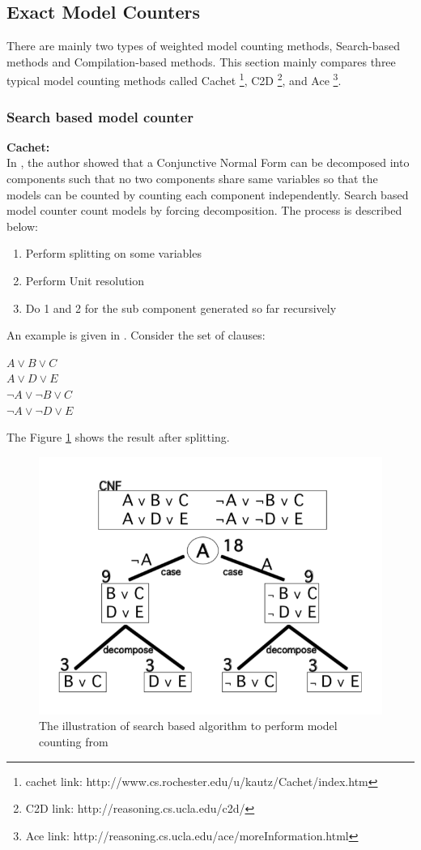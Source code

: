     \subsection{Exact Model Counters}
    There are mainly two types of weighted model counting methods, Search-based methods and Compilation-based methods. This section mainly compares three typical model counting methods called Cachet \footnote{cachet link: http://www.cs.rochester.edu/u/kautz/Cachet/index.htm}, C2D \footnote{C2D link: http://reasoning.cs.ucla.edu/c2d/}, and Ace \footnote{Ace link: http://reasoning.cs.ucla.edu/ace/moreInformation.html}.
    \subsubsection{Search based model counter}
    \textbf{Cachet:}\\
    In \cite{Bayardo:2000:CMU:647288.721114}, the author showed that a Conjunctive Normal Form can be decomposed into components such that no two components share same variables
    so that the models can be counted by counting each component independently.
    Search based model counter count models by forcing decomposition. The process is described below:
    \begin{enumerate}
        \item Perform splitting on some variables
        \item Perform Unit resolution
        \item Do 1 and 2 for the sub component generated so far recursively 
    \end{enumerate}
    An example is given in \cite{2008-literature-review}. Consider the set of clauses:\\
    \begin{center}
        $A \vee B \vee C$\\
        $A \vee D \vee E$\\
        $\neg A \vee \neg B \vee C$\\
        $\neg A \vee \neg D \vee E$\\
    \end{center}
    
   \noindent  The Figure \ref{fig:searchfig} shows the result after splitting.\\
    
    \begin{figure}
        \centering
        \includegraphics[width = 0.5 \textwidth]{pic/searchalgo.png}
        \caption{The illustration of search based algorithm to perform model counting from \cite{2008-literature-review}}
        \label{fig:searchfig}
    \end{figure}
    

